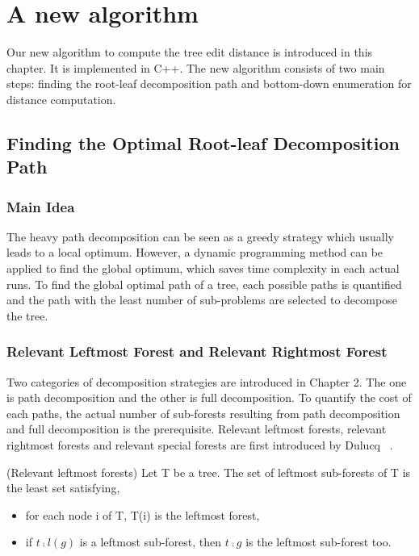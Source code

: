 \doublespacing
\chapter{A new algorithm}
Our new algorithm to compute the tree edit distance is introduced in this chapter. It is implemented in C++. The new algorithm consists of two main steps: finding the root-leaf decomposition path and bottom-down enumeration for distance computation.
\section{Finding the Optimal Root-leaf Decomposition Path}
\subsection{Main Idea}
The heavy path decomposition can be seen as a greedy strategy which usually leads to a local optimum. However, a dynamic programming method can be applied to find the global optimum, which saves time complexity in each actual runs. To find the global optimal path of a tree, each possible paths is quantified and the path with the least number of sub-problems are selected to decompose the tree.
\subsection{Relevant Leftmost Forest and Relevant Rightmost Forest}

Two categories of decomposition strategies are introduced in Chapter 2. The one is path decomposition and the other is full decomposition. To quantify the cost of each paths, the actual number of sub-forests resulting from path decomposition and full decomposition is the prerequisite. Relevant leftmost forests, relevant rightmost forests and relevant special forests are first introduced by Dulucq ~\cite{dulucq2005decomposition}.

\begin{definition}
(Relevant leftmost forests)
Let T be a tree. The set of leftmost sub-forests of T is the least set satisfying, 
\begin{itemize}
\item for each node i of T, T(i) is the leftmost forest,
\item if $t \comp l(g)$ is a leftmost sub-forest, then $t \comp g$ is the leftmost sub-forest too.
\end{itemize}
\end{definition}

